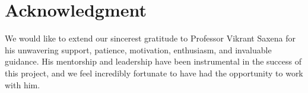 
\section{Acknowledgment}
We would like to extend our sincerest gratitude to Professor Vikrant Saxena for his unwavering support, patience, motivation, enthusiasm, and invaluable guidance. His mentorship and leadership have been instrumental in the success of this project, and we feel incredibly fortunate to have had the opportunity to work with him.
\newpage
\printbibliography
